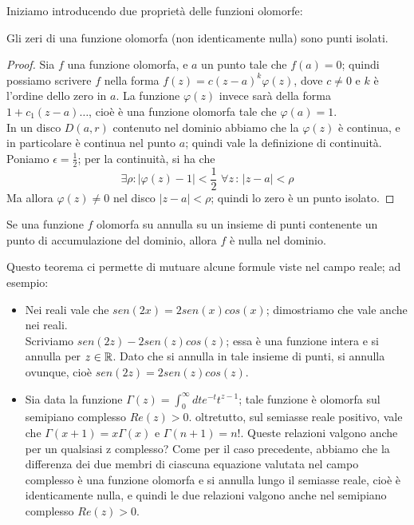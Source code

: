 Iniziamo introducendo due proprietà delle funzioni olomorfe:
\begin{teorema}
Gli zeri di una funzione olomorfa (non identicamente nulla) sono punti isolati.
\end{teorema}
\begin{proof}
Sia $f$ una funzione olomorfa, e $a$ un punto tale che $f(a)=0$; quindi possiamo scrivere $f$ nella forma $f(z)=c(z-a)^k \varphi (z)$, dove $c \neq 0$ e $k$ è l'ordine dello zero in $a$. La funzione $\varphi (z)$ invece sarà della forma $1+c_1 (z-a) \dots$, cioè è una funzione olomorfa tale che $\varphi (a)=1$.\\In un disco $D(a,r)$ contenuto nel dominio abbiamo che la $\varphi (z)$ è continua, e in particolare è continua nel punto $a$; quindi vale la definizione di continuità.\\
Poniamo $\epsilon = \frac{1}{2}$; per la continuità, si ha che 
$$\exists \rho : |\varphi (z) -1|<\frac{1}{2} \, \, \forall z \, : \, |z-a| < \rho$$
Ma allora $\varphi (z) \neq 0$ nel disco $|z-a| < \rho$; quindi lo zero è un punto isolato.

\end{proof}
\begin{teorema}
Se una funzione $f$ olomorfa su annulla su un insieme di punti contenente un punto di accumulazione del dominio, allora $f$ è nulla nel dominio.
\end{teorema}
Questo teorema ci permette di mutuare alcune formule viste nel campo reale; ad esempio:
\begin{itemize}
\item Nei reali vale che $sen(2x)=2sen(x)cos(x)$; dimostriamo che vale anche nei reali. \\Scriviamo $sen(2z)-2sen(z)cos(z)$; essa è una funzione intera e si annulla per $z \in \mathbb{R}$. Dato che si annulla in tale insieme di punti, si annulla ovunque, cioè $sen(2z)=2sen(z)cos(z)$.
\item Sia data la funzione $\Gamma(z)=\int_0 ^{\infty} dt e^{-t} t^{z-1}$; tale funzione è olomorfa sul semipiano complesso $Re(z)>0$. oltretutto, sul semiasse reale positivo, vale che $\Gamma(x+1)=x\Gamma(x)$ e $\Gamma(n+1)=n!$. Queste relazioni valgono anche per un qualsiasi z complesso? Come per il caso precedente, abbiamo che la differenza dei due membri di ciascuna equazione valutata nel campo complesso è una funzione olomorfa e si annulla lungo il semiasse reale, cioè è identicamente nulla, e quindi le due relazioni valgono anche nel semipiano complesso $Re(z)>0$.
\end{itemize}

